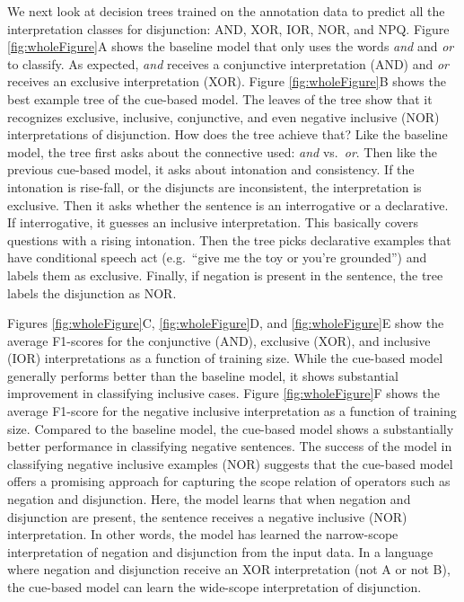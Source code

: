 \documentclass[,man,floatsintext]{apa6}
\begin{document}
We next look at decision trees trained on the annotation data to predict all the interpretation classes for disjunction: AND, XOR, IOR, NOR, and NPQ. Figure \ref{fig:wholeFigure}A shows the baseline model that only uses the words \emph{and} and \emph{or} to classify. As expected, \emph{and} receives a conjunctive interpretation (AND) and \emph{or} receives an exclusive interpretation (XOR). Figure \ref{fig:wholeFigure}B shows the best example tree of the cue-based model. The leaves of the tree show that it recognizes exclusive, inclusive, conjunctive, and even negative inclusive (NOR) interpretations of disjunction. How does the tree achieve that? Like the baseline model, the tree first asks about the connective used: \emph{and} vs.~\emph{or}. Then like the previous cue-based model, it asks about intonation and consistency. If the intonation is rise-fall, or the disjuncts are inconsistent, the interpretation is exclusive. Then it asks whether the sentence is an interrogative or a declarative. If interrogative, it guesses an inclusive interpretation. This basically covers questions with a rising intonation. Then the tree picks declarative examples that have conditional speech act (e.g.~\enquote{give me the toy or you're grounded}) and labels them as exclusive. Finally, if negation is present in the sentence, the tree labels the disjunction as NOR.

Figures \ref{fig:wholeFigure}C, \ref{fig:wholeFigure}D, and \ref{fig:wholeFigure}E show the average F1-scores for the conjunctive (AND), exclusive (XOR), and inclusive (IOR) interpretations as a function of training size. While the cue-based model generally performs better than the baseline model, it shows substantial improvement in classifying inclusive cases. Figure \ref{fig:wholeFigure}F shows the average F1-score for the negative inclusive interpretation as a function of training size. Compared to the baseline model, the cue-based model shows a substantially better performance in classifying negative sentences. The success of the model in classifying negative inclusive examples (NOR) suggests that the cue-based model offers a promising approach for capturing the scope relation of operators such as negation and disjunction. Here, the model learns that when negation and disjunction are present, the sentence receives a negative inclusive (NOR) interpretation. In other words, the model has learned the narrow-scope interpretation of negation and disjunction from the input data. In a language where negation and disjunction receive an XOR interpretation (not A or not B), the cue-based model can learn the wide-scope interpretation of disjunction.
\end{document}

